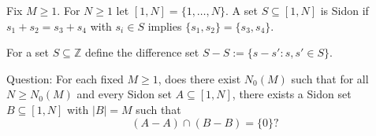 Fix $M\ge1$. For $N\ge1$ let $[1,N]=\{1,\dots,N\}$. A set $S\subseteq[1,N]$ is Sidon if $s_1+s_2=s_3+s_4$ with $s_i\in S$ implies $\{s_1,s_2\}=\{s_3,s_4\}$.

For a set $S\subseteq\mathbb Z$ define the difference set $S-S:=\{s-s': s,s'\in S\}$.

Question: For each fixed $M\ge1$, does there exist $N_0(M)$ such that for all $N\ge N_0(M)$ and every Sidon set $A\subseteq[1,N]$, there exists a Sidon set $B\subseteq[1,N]$ with $|B|=M$ such that
\[
(A-A)\cap(B-B)=\{0\}?
\]
